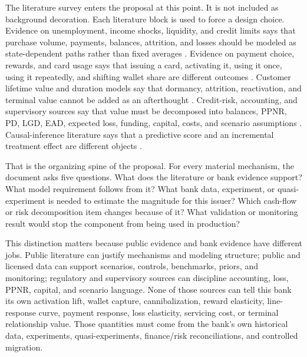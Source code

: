 \documentclass[11pt]{article}
\newcommand{\1}{\mathbf{1}}
\begin{document}
The literature survey enters the proposal at this point. It is not included as
background decoration. Each literature block is used to force a design choice.
Evidence on unemployment, income shocks, liquidity, and credit limits says that
purchase volume, payments, balances, attrition, and losses should be modeled as
state-dependent paths rather than fixed averages
\citep{ganong2019unemployment,johnson2004rebates,gross2001liquidity}.
Evidence on payment choice, rewards, and card usage says that issuing a card,
activating it, using it once, using it repeatedly, and shifting wallet share are
different outcomes \citep{koulayev2012payment,agarwal2010rewards,
prelec2001creditcard}. Customer lifetime value and duration models say that
dormancy, attrition, reactivation, and terminal value cannot be added as an
afterthought \citep{schmittlein1987counting,fader2005bgnbd,fader2005rfm,
bolton1998duration}. Credit-risk, accounting, and supervisory sources say that
value must be decomposed into balances, PPNR, PD, LGD, EAD, expected loss,
funding, capital, costs, and scenario assumptions
\citep{bcbs2006basel,federalreserve2025stressmethodology,
federalreserve2026stressmethodology}. Causal-inference literature says that a
predictive score and an incremental treatment effect are different objects
\citep{imbensrubin2015causal,angrist2009mostlyharmless,
hernanrobins2020causal}.

That is the organizing spine of the proposal. For every material mechanism, the
document asks five questions. What does the literature or bank evidence support?
What model requirement follows from it? What bank data, experiment, or
quasi-experiment is needed to estimate the magnitude for this issuer? Which
cash-flow or risk decomposition item changes because of it? What validation or
monitoring result would stop the component from being used in production?

This distinction matters because public evidence and bank evidence have
different jobs. Public literature can justify mechanisms and modeling
structure; public and licensed data can support scenarios, controls,
benchmarks, priors, and monitoring; regulatory and supervisory sources can
discipline accounting, loss, PPNR, capital, and scenario language. None of
those sources can tell this bank its own activation lift, wallet capture,
cannibalization, reward elasticity, line-response curve, payment response, loss
elasticity, servicing cost, or terminal relationship value. Those quantities
must come from the bank's own historical data, experiments, quasi-experiments,
finance/risk reconciliations, and controlled migration.
\end{document}
